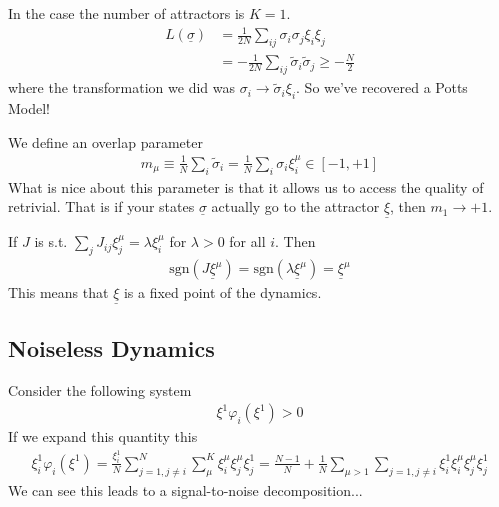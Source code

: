 \begin{sidework}
	In the case the number of attractors is $K=1$.
	\begin{align}
		L(\underline \sigma) & = \frac{1}{2N}\sum_{ij} \sigma_i \sigma_j \xi_i \xi_j\\
		& = - \frac{1}{2N} \sum_{ij} \tilde \sigma_i \tilde \sigma_j \geq - \frac{N}{2}
	\end{align}
	where the transformation we did was $\sigma_i \to \tilde \sigma_i \xi_i$. So we've recovered a Potts Model!
\end{sidework}
\begin{definition}
	 We define an overlap parameter
	\begin{align}
		m_\mu \equiv \frac{1}{N} \sum_i \tilde \sigma_i = \frac{1}{N} \sum_i \sigma_i \xi^\mu_i \in [-1, +1]
	\end{align}
	What is nice about this parameter is that it allows us to access the quality of retrivial. That is if your states $\underline \sigma$ actually go to the attractor $\underline \xi$, then $m_1 \to +1$. 
\end{definition}
\begin{theorem}
	If $J$ is s.t. $\sum_j J_{ij} \xi_j^\mu = \lambda \xi_i^\mu$ for $\lambda >0$ for all $i$. Then
	\begin{align}
		\text{sgn}(J \underline \xi^\mu)=  \text{sgn}( \lambda \underline \xi^\mu) = \underline \xi^\mu
	\end{align}
	This means that $\underline \xi$ is a fixed point of the dynamics.
\end{theorem}
\subsection{Noiseless Dynamics}
Consider the following system
\begin{align}
	\xi^1 \varphi_i (\xi^1) > 0
\end{align}
If we expand this quantity this
\begin{align}
	\xi_i^1 \varphi_i(\xi^1) = \frac{\xi_i^1}{N} \sum_{j=1, j \neq i}^N \sum_\mu^K \xi_i^\mu \xi_j^\mu \xi_j^1 = \frac{N-1}{N} + \frac{1}{N} \sum_{\mu > 1} \sum_{j=1, j\neq i} \xi_i^1 \xi_i^\mu \xi_j^\mu \xi_j^1
\end{align}
We can see this leads to a signal-to-noise decomposition...


